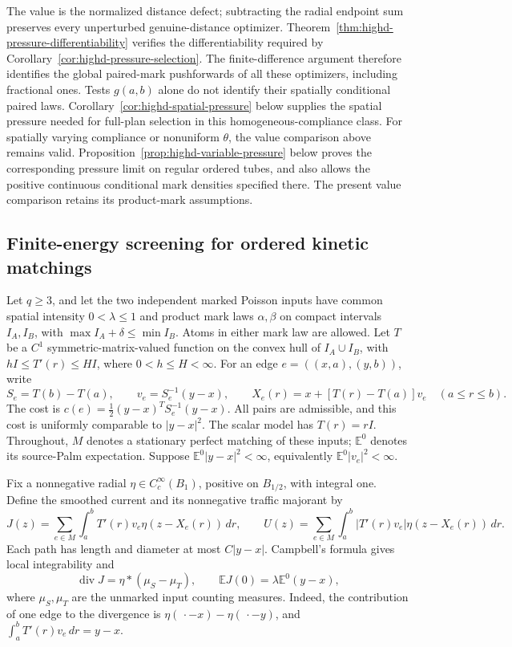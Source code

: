 \documentclass[11pt,reqno]{amsart}
\theoremstyle{definition}
\theoremstyle{remark}
\numberwithin{equation}{section}
\newcommand{\E}{\mathbb E}
\begin{document}
The value is the normalized distance defect; subtracting the radial
endpoint sum preserves every unperturbed genuine-distance optimizer.
Theorem~\ref{thm:highd-pressure-differentiability} verifies the
differentiability required by Corollary~\ref{cor:highd-pressure-selection}.
The finite-difference argument therefore identifies the global paired-mark pushforwards of
all these optimizers, including fractional ones. Tests \(g(a,b)\)
alone do not identify their spatially conditional paired laws.
Corollary~\ref{cor:highd-spatial-pressure} below supplies the spatial
pressure needed for full-plan selection in this homogeneous-compliance class.
For spatially varying compliance or nonuniform \(\theta\), the
value comparison above remains valid. Proposition~\ref{prop:highd-variable-pressure}
below proves the corresponding pressure limit on regular ordered tubes,
and also allows the positive continuous conditional mark densities
specified there. The present value comparison retains its product-mark
assumptions.

\subsection{Finite-energy screening for ordered kinetic matchings}
\label{subsec:highd-kinetic-screening}

Let \(q\ge3\), and let the two independent marked Poisson inputs have
common spatial intensity \(0<\lambda\le1\) and product mark laws
\(\alpha,\beta\) on compact intervals \(I_A,I_B\), with
\(\max I_A+\delta\le\min I_B\). Atoms in either mark law are allowed.
Let \(T\) be a \(C^1\) symmetric-matrix-valued function on the convex
hull of \(I_A\cup I_B\), with \(hI\le T'(r)\le HI\), where
\(0<h\le H<\infty\).
For an edge \(e=((x,a),(y,b))\), write
\[
 S_e=T(b)-T(a),\qquad v_e=S_e^{-1}(y-x),\qquad
 X_e(r)=x+[T(r)-T(a)]v_e\quad(a\le r\le b).
\]
The cost is \(c(e)=\tfrac12(y-x)^TS_e^{-1}(y-x)\).
All pairs are admissible, and this cost is uniformly comparable to
\(|y-x|^2\). The scalar model has \(T(r)=rI\).
Throughout, \(M\) denotes a stationary perfect matching of these inputs;
\(\E^0\) denotes its source-Palm expectation. Suppose
\(\E^0|y-x|^2<\infty\), equivalently \(\E^0|v_e|^2<\infty\).

Fix a nonnegative radial \(\eta\in C_c^\infty(B_1)\), positive on
\(B_{1/2}\), with integral one. Define the smoothed current and its
nonnegative traffic majorant by
\begin{equation}
\label{eq:highd-kinetic-current}
 J(z)=\sum_{e\in M}\int_a^b T'(r)v_e\eta(z-X_e(r))\,dr,
 \qquad
 U(z)=\sum_{e\in M}\int_a^b |T'(r)v_e|\eta(z-X_e(r))\,dr.
\end{equation}
Each path has length and diameter at most \(C|y-x|\). Campbell's
formula gives local integrability and
\begin{equation}
\label{eq:highd-current-divergence}
 \operatorname{div}J=\eta*(\mu_S-\mu_T),\qquad
 \E J(0)=\lambda\E^0(y-x),
\end{equation}
where \(\mu_S,\mu_T\) are the unmarked input counting measures.
Indeed, the contribution of one edge to the divergence is
\(\eta(\,\cdot-x)-\eta(\,\cdot-y)\), and
\(\int_a^b T'(r)v_e\,dr=y-x\).
\end{document}

